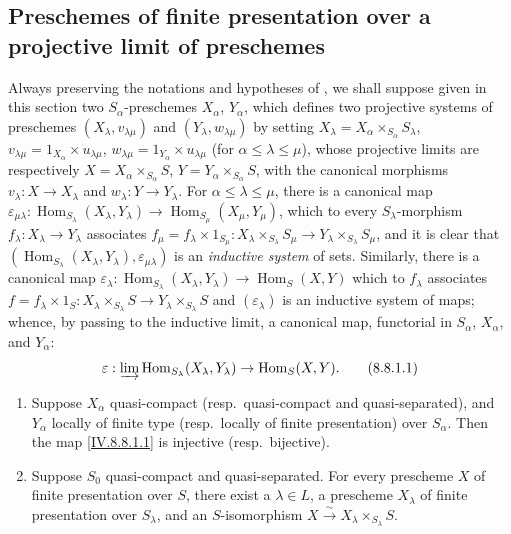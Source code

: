\subsection{Preschemes of finite presentation over a projective limit of preschemes}
\label{subsection:IV.8.8}

\begin{env}[8.8.1]
\label{IV.8.8.1}
Always preserving the notations and hypotheses of , we shall suppose given in this section two $S_\alpha$-preschemes $X_\alpha$, $Y_\alpha$, which defines  two projective systems of preschemes $(X_\lambda,v_{\lambda\mu})$ and $(Y_\lambda,w_{\lambda\mu})$ by setting $X_\lambda=X_\alpha\times_{S_\alpha}S_\lambda$, $v_{\lambda\mu}=1_{X_\alpha}\times u_{\lambda\mu}$, $w_{\lambda\mu}=1_{Y_\alpha}\times u_{\lambda\mu}$ (for $\alpha\leqslant\lambda\leqslant\mu$), whose projective limits are respectively $X=X_\alpha\times_{S_\alpha}S$, $Y=Y_\alpha\times_{S_\alpha}S$, with the canonical morphisms $v_\lambda:X\to X_\lambda$ and $w_\lambda:Y\to Y_\lambda$.
For $\alpha\leqslant\lambda\leqslant\mu$, there is a canonical map $\varepsilon_{\mu\lambda}:\operatorname{Hom}_{S_\lambda}(X_\lambda,Y_\lambda)\to\operatorname{Hom}_{S_\mu}(X_\mu,Y_\mu)$, which to every $S_\lambda$-morphism $f_\lambda:X_\lambda\to Y_\lambda$ associates $f_\mu=f_\lambda\times 1_{S_\mu}:X_\lambda\times_{S_\lambda}S_\mu\to Y_\lambda\times_{S_\lambda}S_\mu$, and it is clear that $(\operatorname{Hom}_{S_\lambda}(X_\lambda,Y_\lambda),\varepsilon_{\mu\lambda})$ is an \emph{inductive system} of sets.
Similarly, there is a canonical map $\varepsilon_\lambda:\operatorname{Hom}_{S_\lambda}(X_\lambda,Y_\lambda)\to\operatorname{Hom}_S(X,Y)$ which to $f_\lambda$ associates $f=f_\lambda\times 1_S:X_\lambda\times_{S_\lambda}S\to Y_\lambda\times_{S_\lambda}S$ and $(\varepsilon_\lambda)$ is an inductive system of maps; whence, by passing to the inductive limit, a canonical map, functorial in $S_\alpha$, $X_\alpha$, and $Y_\alpha$:
\[
  \varepsilon:\varinjlim\operatorname{Hom}_{S_\lambda}(X_\lambda,Y_\lambda)\to\operatorname{Hom}_S(X,Y).
  \tag{8.8.1.1}\label{IV.8.8.1.1}
\]
\end{env}

\begin{theorem}[8.8.2]
\label{IV.8.8.2}
\begin{enumerate}[label=(\roman*)]
\item Suppose $X_\alpha$ quasi-compact (resp.\ quasi-compact and quasi-separated), and $Y_\alpha$ locally of finite type (resp.\ locally of finite presentation) over $S_\alpha$.
Then the map \eqref{IV.8.8.1.1} is injective (resp.\ bijective).
\item Suppose $S_0$ quasi-compact and quasi-separated.
For every prescheme $X$ of finite presentation over $S$, there exist a $\lambda\in L$, a prescheme $X_\lambda$ of finite presentation over $S_\lambda$, and an $S$-isomorphism $X\xrightarrow{\sim}X_\lambda\times_{S_\lambda}S$.
\end{enumerate}
\end{theorem}

